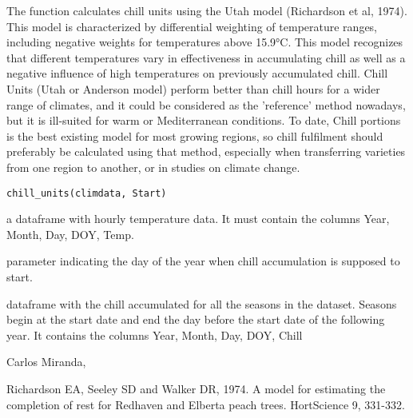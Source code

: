\documentclass[a4paper]{book}
\begin{document}
%
\begin{Description}\relax
The function calculates chill units using the Utah model (Richardson
et al, 1974). This model is characterized by differential weighting of
temperature ranges, including negative weights for temperatures
above 15.9°C. This model recognizes that different temperatures
vary in effectiveness in accumulating chill as well as a negative
influence of high temperatures on previously accumulated chill.
Chill Units (Utah or Anderson model) perform better than chill hours
for a wider range of climates, and it could be considered as the
'reference' method nowadays, but it is ill-suited for warm or
Mediterranean conditions. To date, Chill portions is the best
existing model for most growing regions, so chill fulfilment
should preferably be calculated using that method, especially
when transferring varieties from one region to another, or in
studies on climate change.
\end{Description}
%
\begin{Usage}
\begin{verbatim}
chill_units(climdata, Start)
\end{verbatim}
\end{Usage}
%
\begin{Arguments}
\begin{ldescription}
\item[\code{climdata}] a dataframe with hourly temperature data. It
must contain the columns Year, Month, Day, DOY, Temp.

\item[\code{Start}] parameter indicating the day of the year when chill
accumulation is supposed to start.
\end{ldescription}
\end{Arguments}
%
\begin{Value}
dataframe with the chill accumulated for all the seasons in the
dataset. Seasons begin at the start date and end the day before the start
date of the following year.
It contains the columns Year, Month, Day, DOY, Chill
\end{Value}
%
\begin{Author}\relax
Carlos Miranda, 
\end{Author}
%
\begin{References}\relax
Richardson EA, Seeley SD and Walker DR, 1974. A model for estimating the
completion of rest for Redhaven and Elberta peach trees. HortScience 9,
331-332.
\end{References}
\end{document}
